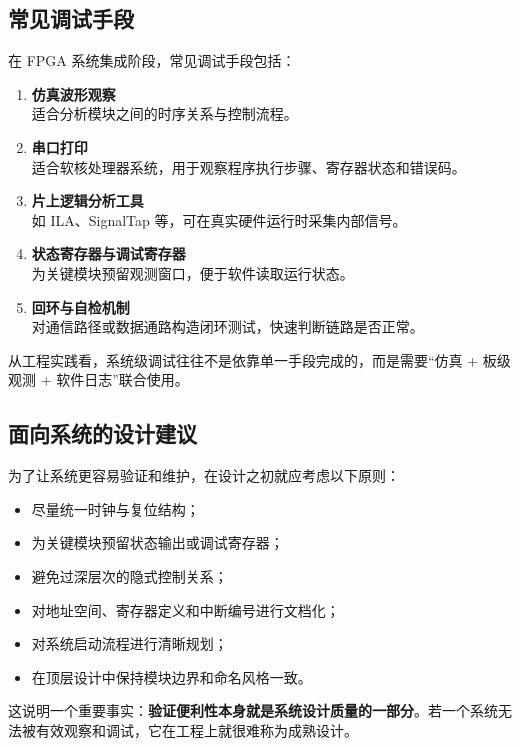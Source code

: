 \subsection{常见调试手段}\label{ux5e38ux89c1ux8c03ux8bd5ux624bux6bb5}

在 FPGA 系统集成阶段，常见调试手段包括：

\begin{enumerate}
\def\labelenumi{\arabic{enumi}.}
\item
  \textbf{仿真波形观察}\\
  适合分析模块之间的时序关系与控制流程。
\item
  \textbf{串口打印}\\
  适合软核处理器系统，用于观察程序执行步骤、寄存器状态和错误码。
\item
  \textbf{片上逻辑分析工具}\\
  如 ILA、SignalTap 等，可在真实硬件运行时采集内部信号。
\item
  \textbf{状态寄存器与调试寄存器}\\
  为关键模块预留观测窗口，便于软件读取运行状态。
\item
  \textbf{回环与自检机制}\\
  对通信路径或数据通路构造闭环测试，快速判断链路是否正常。
\end{enumerate}

从工程实践看，系统级调试往往不是依靠单一手段完成的，而是需要``仿真 +
板级观测 + 软件日志''联合使用。

\subsection{面向系统的设计建议}\label{ux9762ux5411ux7cfbux7edfux7684ux8bbeux8ba1ux5efaux8bae}

为了让系统更容易验证和维护，在设计之初就应考虑以下原则：

\begin{itemize}
\tightlist
\item
  尽量统一时钟与复位结构；
\item
  为关键模块预留状态输出或调试寄存器；
\item
  避免过深层次的隐式控制关系；
\item
  对地址空间、寄存器定义和中断编号进行文档化；
\item
  对系统启动流程进行清晰规划；
\item
  在顶层设计中保持模块边界和命名风格一致。
\end{itemize}

这说明一个重要事实：\textbf{验证便利性本身就是系统设计质量的一部分}。若一个系统无法被有效观察和调试，它在工程上就很难称为成熟设计。

